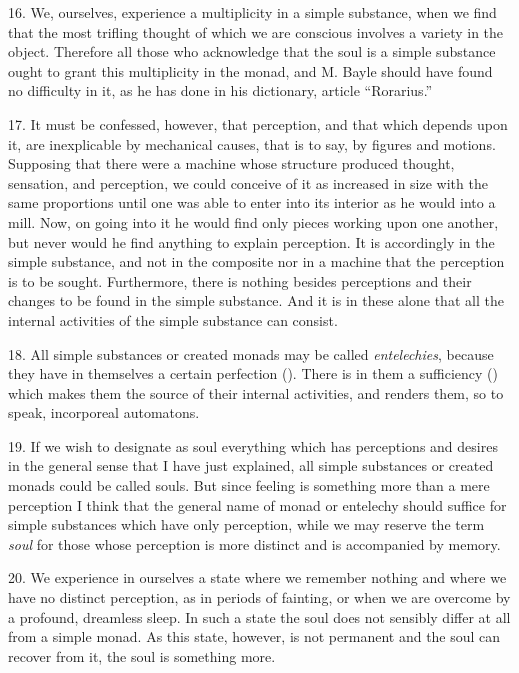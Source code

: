 16. We, ourselves, experience a multiplicity in a simple substance,
when we find that the most trifling thought of which we are conscious
involves a variety in the object. Therefore all those who acknowledge
that the soul is a simple substance ought to grant this multiplicity
in the monad, and M. Bayle should have found no difficulty in it, as
he has done in his dictionary, article ``Rorarius.''

17. It must be confessed, however, that perception, and that which
depends upon it, are inexplicable by mechanical causes, that is to
say, by figures and motions. Supposing that there were a machine whose
structure produced thought, sensation, and perception, we could
conceive of it as increased in size with the same proportions until
one was able to enter into its interior as he would into a mill. Now,
on going into it he would find only pieces working upon one another,
but never would he find anything to explain perception. It is
accordingly in the simple substance, and not in the composite nor in a
machine that the perception is to be sought. Furthermore, there is
nothing besides perceptions and their changes to be found in the
simple substance. And it is in these alone that all the internal
activities of the simple substance can consist.

18. All simple substances or created monads may be called
\textit{entelechies}, because they have in themselves a certain
perfection (). There is in them a sufficiency
() which makes them the source of their internal
activities, and renders them, so to speak, incorporeal automatons.

19. If we wish to designate as soul everything which has
perceptions and desires in the general sense that I have just
explained, all simple substances or created monads could be called
souls. But since feeling is something more than a mere perception I
think that the general name of monad or entelechy should suffice for
simple substances which have only perception, while we may reserve the
term \textit{soul} for those whose perception is more distinct and is
accompanied by memory.

20. We experience in ourselves a state where we remember nothing and
where we have no distinct perception, as in periods of fainting, or
when we are overcome by a profound, dreamless sleep. In such a state
the soul does not sensibly differ at all from a simple monad. As this
state, however, is not permanent and the soul can recover from it, the
soul is something more.


